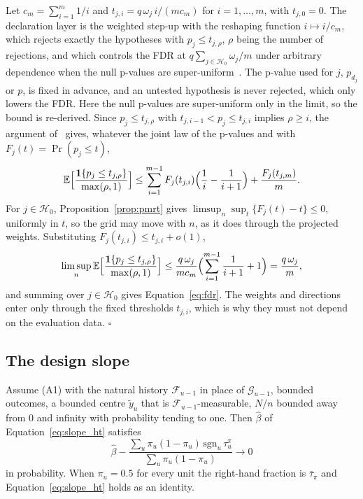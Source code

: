 Let $c_m = \sum_{i=1}^m 1/i$ and $t_{j,i} = q\, \omega_j\, i / (m c_m)$ for $i = 1, \dots, m$, with $t_{j,0} = 0$. The
declaration layer is the weighted step-up with the reshaping function $i \mapsto i / c_m$, which rejects exactly the hypotheses
with $p_j \le t_{j,\rho}$, $\rho$ being the number of rejections, and which controls the FDR at
$q \sum_{j \in \mathcal{H}_0} \omega_j / m$ under arbitrary dependence when the null p-values are
super-uniform~\cite[Thm.~4.2]{blanchard2008fdr}. The p-value used for $j$, $p_{d_j}$ or $p$, is fixed in advance, and
an untested hypothesis is never rejected, which only lowers the FDR. Here the null p-values are super-uniform only in
the limit, so the bound is re-derived. Since $p_j \le t_{j,\rho}$ with $t_{j,i-1} < p_j \le t_{j,i}$ implies
$\rho \ge i$, the argument of~\cite{benjamini2001dependency} gives, whatever the joint law of the p-values and with
$F_j(t) = \Pr(p_j \le t)$,
\begin{equation*}
\mathbb{E}\Bigl[\frac{\mathbf{1}\{p_j \le t_{j,\rho}\}}{\max(\rho, 1)}\Bigr]
\le \sum_{i=1}^{m-1} F_j(t_{j,i}) \Bigl(\frac{1}{i} - \frac{1}{i+1}\Bigr) + \frac{F_j(t_{j,m})}{m}.
\end{equation*}
For $j \in \mathcal{H}_0$, Proposition~\ref{prop:pmrt} gives
$\limsup_n \sup_t \{F_j(t) - t\} \le 0$, uniformly in $t$, so the grid may move with $n$, as it does
through the projected weights. Substituting $F_j(t_{j,i}) \le t_{j,i} + o(1)$,
\begin{equation*}
\limsup_{n} \mathbb{E}\Bigl[\frac{\mathbf{1}\{p_j \le t_{j,\rho}\}}{\max(\rho, 1)}\Bigr]
\le \frac{q\, \omega_j}{m c_m} \Bigl( \sum_{i=1}^{m-1} \frac{1}{i+1} + 1 \Bigr) = \frac{q\, \omega_j}{m},
\end{equation*}
and summing over $j \in \mathcal{H}_0$ gives Equation~\eqref{eq:fdr}. The weights and directions
enter only through the fixed thresholds $t_{j,i}$, which is why they must not depend on the
evaluation data. \hfill$\square$

\subsection{The design slope}
\label{app:proof_slope}

\begin{lemma}
\label{lem:slope}
Assume (A1) with the natural history $\mathcal{F}_{u-1}$ in place of $\mathcal{G}_{u-1}$, bounded
outcomes, a bounded centre $\tilde y_u$ that is $\mathcal{F}_{u-1}$-measurable, $N / n$ bounded away from 0 and
infinity with probability tending to one. Then
$\hat\beta$ of Equation~\eqref{eq:slope_ht} satisfies
\begin{equation*}
\hat\beta - \frac{\sum_u \pi_u (1 - \pi_u)\, \mathrm{sgn}_u\, \tau_u^{\pi}}{\sum_u \pi_u (1 - \pi_u)} \to 0
\end{equation*}
in probability. When $\pi_u = 0.5$ for every unit the right-hand fraction is $\bar\tau_{\pi}$
and Equation~\eqref{eq:slope_ht} holds as an identity.
\end{lemma}

